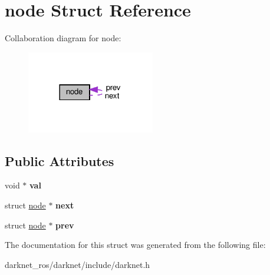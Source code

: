 \hypertarget{structnode}{}\section{node Struct Reference}
\label{structnode}


Collaboration diagram for node\+:
\nopagebreak
\begin{figure}[H]
\begin{center}
\leavevmode
\includegraphics[width=158pt]{structnode__coll__graph}
\end{center}
\end{figure}
\subsection*{Public Attributes}
\begin{DoxyCompactItemize}
\item 
\mbox{\label{structnode_a3866f55c05d50265b730d8cdeec0a1f8}} 
void $\ast$ {\bfseries val}
\item 
\mbox{\label{structnode_aa3e8aa83f864292b5a01210f4453fcc0}} 
struct \hyperlink{structnode}{node} $\ast$ {\bfseries next}
\item 
\mbox{\label{structnode_a7ee3d227c728ce18a86e43ebc301046e}} 
struct \hyperlink{structnode}{node} $\ast$ {\bfseries prev}
\end{DoxyCompactItemize}


The documentation for this struct was generated from the following file\+:\begin{DoxyCompactItemize}
\item 
darknet\+\_\+ros/darknet/include/darknet.\+h\end{DoxyCompactItemize}
